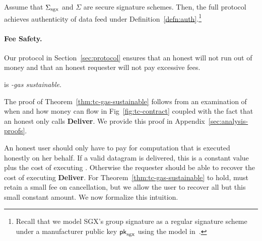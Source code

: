 \vspace{2mm}
\begin{theorem}[Authenticity]
\label{thm:authenticity}
Assume that ${\Sigma_{\textrm{sgx}}}$
and $\Sigma$ are secure signature schemes.
Then, the full \tc
protocol achieves authenticity of data feed under Definition~\ref{defn:auth}.\footnote{Recall
that we
model SGX's group signature as a regular signature
scheme under a manufacturer public key ${\sf pk}_{\mathrm{sgx}}$ using the model in~\cite{sgxsok}.}
\end{theorem}




\paragraph{Fee Safety.}
Our protocol in Section~\ref{sec:protocol} ensures that an honest \tcs will not run out of money
and that an honest requester will not pay excessive fees.

\begin{theorem}
\label{thm:tc-gas-sustainable}
\tcs is \emph{\constgasmax-gas sustainable}.
\end{theorem}

The proof of Theorem~\ref{thm:tc-gas-sustainable} follows from an examination of when and how money can flow in Fig~\ref{fig:tc-contract}
coupled with the fact that an honest \tc only calls {\bf Deliver}.
We provide this proof in Appendix~\ref{sec:analysis-proofs}.

An honest user should only have to pay for computation that is executed honestly on her behalf.
If a valid datagram is delivered, this is a constant value plus the cost of executing \dgcallback.
Otherwise the requester should be able to recover the cost of executing {\bf Deliver}.
For Theorem~\ref{thm:tc-gas-sustainable} to hold, \tcont must retain a small fee on cancellation,
but we allow the user to recover all but this small constant amount.
We now formalize this intuition.

